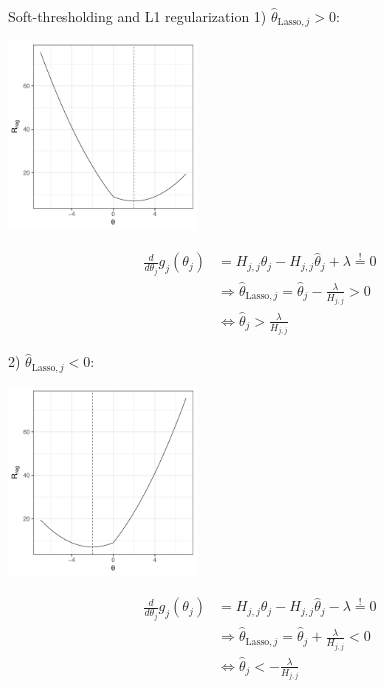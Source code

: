 \documentclass[11pt,compress,t,notes=noshow, xcolor=table]{beamer}
\begin{document}
\begin{vbframe}{Soft-thresholding and L1 regularization}
1) $\hat{\theta}_{\text{Lasso},j} > 0:$ \\
\lz
\begin{minipage}{0.4\textwidth}
    \includegraphics[width=5cm]{slides/regularization/figure/th_l1_pos.pdf}
\end{minipage}
\hfill
\begin{minipage}{0.49\textwidth}
\begin{align*}
    \frac{d}{d \theta_j}g_j(\theta_j) &= H_{j,j}\theta_j - H_{j,j} \hat{\theta}_j + \lambda \overset{!}{=} 0 \\
    &\Rightarrow  \hat{\theta}_{\text{Lasso},j} = \hat{\theta}_j 
 -\frac{\lambda}{H_{j,j}} > 0 \\
 &\iff \hat{\theta}_j >  \frac{\lambda}{H_{j,j}}
\end{align*}
\end{minipage}
 \newpage

2) $\hat{\theta}_{\text{Lasso},j} < 0:$ \\
\lz
\begin{minipage}{0.4\textwidth}
    \includegraphics[width=5cm]{slides/regularization/figure/th_l1_neg.pdf}
\end{minipage}
\hfill
\begin{minipage}{0.49\textwidth}
\begin{align*}
    \frac{d}{d \theta_j}g_j(\theta_j) &= H_{j,j}\theta_j - H_{j,j} \hat{\theta}_j - \lambda \overset{!}{=} 0 \\
    &\Rightarrow  \hat{\theta}_{\text{Lasso},j} = \hat{\theta}_j 
 +\frac{\lambda}{H_{j,j}} < 0 \\
 &\iff \hat{\theta}_j < -\frac{\lambda}{H_{j,j}}
\end{align*}
\end{minipage}
 \newpage



\end{vbframe}
\end{document}
